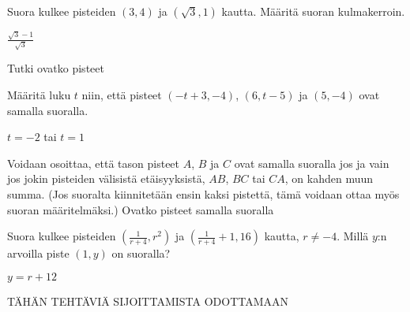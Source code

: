 \begin{tehtavasivu}
\begin {tehtava}
Suora kulkee pisteiden $(3, 4)$ ja $(\sqrt{3}, 1)$ kautta. Määritä suoran kulmakerroin.
\begin {vastaus}
$\frac{\sqrt{3}-1}{\sqrt{3}}$
\end {vastaus}
\end {tehtava}

\sarjaB %

\begin{tehtava}
Tutki ovatko pisteet  
\begin{vastaus}
\end{vastaus}
\end{tehtava}

\begin{tehtava}
Määritä luku $t$ niin, että pisteet $(-t+3, -4)$, $(6, t-5)$ ja $(5, -4)$ ovat samalla suoralla.
\begin{vastaus}
$t=-2$ tai $t=1$
\end{vastaus}
\end{tehtava}

\begin{tehtava}
Voidaan osoittaa, että tason pisteet $A$, $B$ ja $C$ ovat samalla suoralla jos ja vain jos jokin pisteiden välisistä etäisyyksistä, $AB$, $BC$ tai $CA$, on kahden muun summa. (Jos suoralta kiinnitetään ensin kaksi pistettä, tämä voidaan ottaa myös suoran määritelmäksi.) Ovatko pisteet samalla suoralla
	\begin{vastaus}
	\end{vastaus}
\end{tehtava}

\sarjaC %

\begin{tehtava}
Suora kulkee pisteiden $(\frac{1}{r+4}, r^2)$ ja $(\frac{1}{r+4}+1, 16)$ kautta, $r \neq -4$. Millä $y$:n arvoilla piste $(1,y)$ on suoralla?
	\begin{vastaus}
	$y = r+12$
	\end{vastaus}
\end{tehtava}

\sarjaD %

TÄHÄN TEHTÄVIÄ SIJOITTAMISTA ODOTTAMAAN

\end{tehtavasivu}
